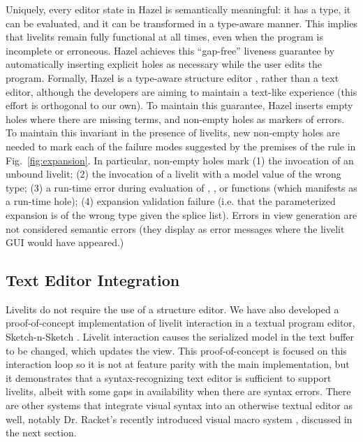 Uniquely, every editor state in Hazel is 
semantically meaningful: it has a type, it can be evaluated, and it can be transformed 
in a type-aware manner. This implies that livelits remain fully functional at all times, 
even when the program is incomplete or erroneous. Hazel achieves this ``gap-free'' liveness guarantee by automatically inserting explicit holes as necessary 
while the user edits 
the program. Formally, Hazel is a type-aware structure editor \cite{Hazelnut}, rather than a text editor, 
although the developers are aiming to maintain a text-like experience (this effort is orthogonal to our own). 
To maintain this guarantee, Hazel inserts empty holes where there are missing terms, 
and non-empty holes as markers of errors. To maintain this invariant in the presence of livelits, 
new non-empty holes are needed to mark each of the failure modes suggested by the premises of the  rule in Fig.~\ref{fig:expansion}. 
In particular, non-empty holes mark (1) the invocation of an unbound livelit; (2) the invocation of a livelit 
with a model value of the wrong type; 
(3) a run-time error during evaluation of , , or  functions (which manifests as a run-time hole); (4) 
expansion validation failure (i.e. that the parameterized expansion is of the wrong type given the splice list).  
Errors in view generation are not considered semantic errors (they display as error messages where the livelit GUI would have appeared.)




\subsection{Text Editor Integration}
Livelits do not require the use of a structure editor. 
We have also developed a 
proof-of-concept implementation of livelit interaction in a textual program editor, Sketch-n-Sketch \cite{sns-pldi,sns-uist}.
Livelit interaction causes the serialized model in the text buffer to be changed, which updates the view.
This proof-of-concept is focused on this interaction loop so it is not at feature parity with the 
 main implementation, but it demonstrates that a syntax-recognizing text editor \cite{DBLP:journals/tosem/BallanceGV92,DBLP:conf/sde/HorganM84,interactive-visual-syntax} 
is sufficient to support livelits, albeit with some gaps in availability when 
there are syntax errors.
There are other systems that integrate visual syntax into an otherwise textual editor as well, notably Dr. Racket's recently introduced visual macro system \cite{interactive-visual-syntax}, discussed in the next section.


